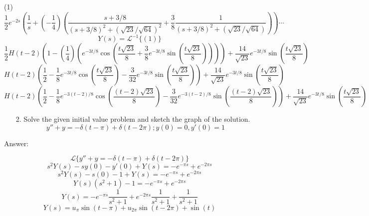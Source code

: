 \documentclass{article}
\begin{document}
\begin{center}
        (1)
        $$\dfrac{1}{2}e^{-2s}(\dfrac{1}{s} +(-\dfrac{1}{4})(\dfrac{s + 3/8}{(s + 3/8)^2 + (\sqrt{23}/\sqrt{64})^2} + \dfrac{3}{8}\dfrac{1}{(s + 3/8)^2 + (\sqrt{23}/\sqrt{64})})) \cdots$$
        $$Y(s) = \mathcal{L}^{-1}\{(1)\}$$
        $$\dfrac{1}{2}H(t - 2)(1 - (\dfrac{1}{4})(e^{-3t/8}\cos(\dfrac{t\sqrt{23}}{8} + \dfrac{3}{8}e^{-3t/8}\sin(\dfrac{t\sqrt{23}}{8})))) + \dfrac{14}{\sqrt{23}}e^{-3t/8}\sin(\dfrac{t\sqrt{23}}{8})$$
        $$H(t - 2)(\dfrac{1}{2} - \dfrac{1}{8}e^{-3t/8}\cos(\dfrac{t\sqrt{23}}{8})- \dfrac{3}{32}e^{-3t/8}\sin(\dfrac{t\sqrt{23}}{8})) + \dfrac{14}{\sqrt{23}}e^{-3t/8}\sin(\dfrac{t\sqrt{23}}{8})$$
        $$\boxed{H(t - 2)(\dfrac{1}{2} - \dfrac{1}{8}e^{-3(t-2)/8}\cos(\dfrac{(t-2)\sqrt{23}}{8})- \dfrac{3}{32}e^{-3(t-2)/8}\sin(\dfrac{(t-2)\sqrt{23}}{8})) + \dfrac{14}{\sqrt{23}}e^{-3t/8}\sin(\dfrac{t\sqrt{23}}{8})}$$
        
    \end{center}

\newpage
\begin{enumerate}
    \item[2.]
    Solve the given initial value problem and sketch the graph of the solution. 
    $$y'' + y = -\delta(t - \pi) + \delta(t - 2\pi); y(0) = 0, y'(0) = 1$$
\end{enumerate}

Answer: 

    \begin{center}
        $$\mathcal{L}\{y'' + y = -\delta(t - \pi) + \delta(t - 2\pi)\}$$
        $$s^2Y(s) - sy(0) - y'(0) + Y(s) = -e^{-\pi s} + e^{-2\pi s}$$
        $$s^2Y(s) - s(0) - 1 + Y(s) = -e^{-\pi s} + e^{-2\pi s}$$
        $$Y(s)(s^2 + 1) - 1 = -e^{-\pi s} + e^{-2\pi s}$$
        $$Y(s) = -e^{-\pi s} \dfrac{1}{s^2 + 1} + e^{-2\pi s} \dfrac{1}{s^2 + 1} + \dfrac{1}{s^2 + 1}$$
        $$\boxed{Y(s) = u_{\pi}\sin(t - \pi) + u_{2\pi}\sin(t - 2\pi) + \sin(t)}$$
    \end{center}
\end{document}

